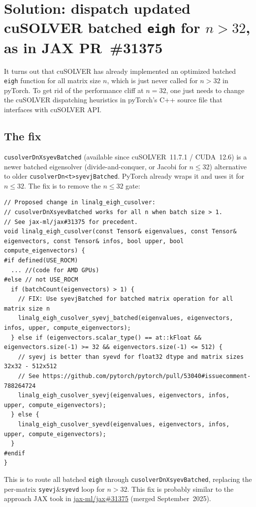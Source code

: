 \documentclass[10pt, letterpaper]{article}
\begin{document}
\section{Solution: dispatch updated cuSOLVER batched
  \texttt{eigh} for $n>32$,
  as in JAX PR~\#31375}
\label{sec:fix}
It turns out that cuSOLVER has already implemented an optimized batched \texttt{eigh} function for all matrix size $n$, which is just never called for $n>32$ in pyTorch. To get rid of the performance cliff at $n=32$, one just needs to change the cuSOLVER dispatching heuristics in pyTorch's C++ source file that interfaces with cuSOLVER API.

\subsection{The fix}

\texttt{cusolverDnXsyevBatched} (available since cuSOLVER~11.7.1 /
CUDA~12.6) is a newer batched eigensolver (divide-and-conquer, or Jacobi for $n\le32$) alternative to older \texttt{cusolverDn<t>syevjBatched}. PyTorch already wraps it and uses it
for $n \le 32$. The fix is to remove the $n \le 32$ gate:

\begin{lstlisting}
// Proposed change in linalg_eigh_cusolver:
// cusolverDnXsyevBatched works for all n when batch size > 1.
// See jax-ml/jax#31375 for precedent.
void linalg_eigh_cusolver(const Tensor& eigenvalues, const Tensor& eigenvectors, const Tensor& infos, bool upper, bool compute_eigenvectors) {
#if defined(USE_ROCM)
  ... //(code for AMD GPUs)
#else // not USE_ROCM
  if (batchCount(eigenvectors) > 1) {
    // FIX: Use syevjBatched for batched matrix operation for all matrix size n
    linalg_eigh_cusolver_syevj_batched(eigenvalues, eigenvectors, infos, upper, compute_eigenvectors);
  } else if (eigenvectors.scalar_type() == at::kFloat && eigenvectors.size(-1) >= 32 && eigenvectors.size(-1) <= 512) {
    // syevj is better than syevd for float32 dtype and matrix sizes 32x32 - 512x512
    // See https://github.com/pytorch/pytorch/pull/53040#issuecomment-788264724
    linalg_eigh_cusolver_syevj(eigenvalues, eigenvectors, infos, upper, compute_eigenvectors);
  } else {
    linalg_eigh_cusolver_syevd(eigenvalues, eigenvectors, infos, upper, compute_eigenvectors);
  }
#endif
}
\end{lstlisting}

This is to route all batched \texttt{eigh} through
\texttt{cusolverDnXsyevBatched}, replacing the per-matrix
\texttt{syevj}\&\texttt{syevd} loop for $n>32$. This fix is probably similar to the approach JAX took in
\href{https://github.com/jax-ml/jax/pull/31375}{jax-ml/jax\#31375}
(merged September~2025).
\end{document}
